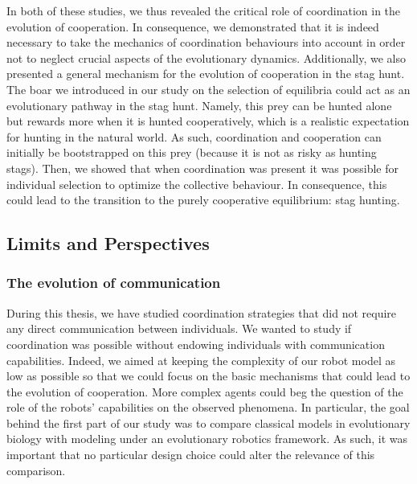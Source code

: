 		In both of these studies, we thus revealed the critical role of coordination in the evolution of cooperation. In consequence, we demonstrated that it is indeed necessary to take the mechanics of coordination behaviours into account in order not to neglect crucial aspects of the evolutionary dynamics. Additionally, we also presented a general mechanism for the evolution of cooperation in the stag hunt. The boar we introduced in our study on the selection of equilibria could act as an evolutionary pathway in the stag hunt. Namely, this prey can be hunted alone but rewards more when it is hunted cooperatively, which is a realistic expectation for hunting in the natural world. As such, coordination and cooperation can initially be bootstrapped on this prey (because it is not as risky as hunting stags). Then, we showed that when coordination was present it was possible for individual selection to optimize the collective behaviour. In consequence, this could lead to the transition to the purely cooperative equilibrium: stag hunting.


	\subsection{Limits and Perspectives}

		\subsubsection{The evolution of communication}

			During this thesis, we have studied coordination strategies that did not require any direct communication between individuals. We wanted to study if coordination was possible without endowing individuals with communication capabilities. Indeed, we aimed at keeping the complexity of our robot model as low as possible so that we could focus on the basic mechanisms that could lead to the evolution of cooperation. More complex agents could beg the question of the role of the robots' capabilities on the observed phenomena. In particular, the goal behind the first part of our study was to compare classical models in evolutionary biology with modeling under an evolutionary robotics framework. As such, it was important that no particular design choice could alter the relevance of this comparison.

